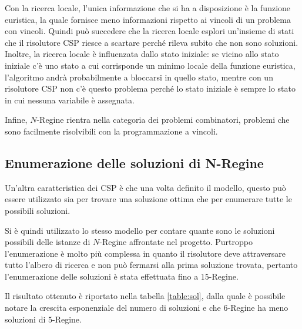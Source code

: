 Con la ricerca locale, l'unica informazione che si ha a disposizione è la funzione euristica, la quale fornisce meno informazioni rispetto ai vincoli di un problema con vincoli.
Quindi può succedere che la ricerca locale esplori un'insieme di stati che il risolutore CSP riesce a scartare perché rileva subito che non sono soluzioni.
Inoltre, la ricerca locale è influenzata dallo stato iniziale: se vicino allo stato iniziale c'è uno stato a cui corrisponde un minimo locale della funzione euristica, l'algoritmo andrà probabilmente a bloccarsi in quello stato, mentre con un risolutore CSP non c'è questo problema perché lo stato iniziale è sempre lo stato in cui nessuna variabile è assegnata.

Infine, $N$-Regine rientra nella categoria dei problemi combinatori, problemi che sono facilmente risolvibili con la programmazione a vincoli.

\subsection{Enumerazione delle soluzioni di N-Regine}

Un'altra caratteristica dei CSP è che una volta definito il modello, questo può essere utilizzato sia per trovare una soluzione ottima che per enumerare tutte le possibili soluzioni.

Si è quindi utilizzato lo stesso modello per contare quante sono le soluzioni possibili delle istanze di $N$-Regine affrontate nel progetto. 
Purtroppo l'enumerazione è molto più complessa in quanto il risolutore deve attraversare tutto l'albero di ricerca e non può fermarsi alla prima soluzione trovata, pertanto l'enumerazione delle soluzioni è stata effettuata fino a $15$-Regine.

Il risultato ottenuto è riportato nella tabella \ref{table:sol}, dalla quale è possibile notare la crescita esponenziale del numero di soluzioni e che $6$-Regine ha meno soluzioni di $5$-Regine.

\begin{table}[]
\centering
{}
\caption{Numero di soluzioni per $N$-Regine}
\label{my-label}
\end{table}


